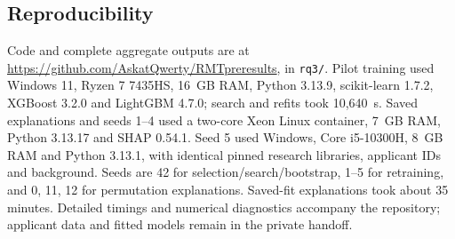 \subsection{Reproducibility}
Code and complete aggregate outputs are at \url{https://github.com/AskatQwerty/RMTpreresults}, in \texttt{rq3/}. Pilot training used Windows 11, Ryzen 7 7435HS, 16~GB RAM, Python 3.13.9, scikit-learn 1.7.2, XGBoost 3.2.0 and LightGBM 4.7.0; search and refits took 10,640~s. Saved explanations and seeds 1--4 used a two-core Xeon Linux container, 7~GB RAM, Python 3.13.17 and SHAP 0.54.1. Seed 5 used Windows, Core i5-10300H, 8~GB RAM and Python 3.13.1, with identical pinned research libraries, applicant IDs and background. Seeds are 42 for selection/search/bootstrap, 1--5 for retraining, and 0, 11, 12 for permutation explanations. Saved-fit explanations took about 35 minutes. Detailed timings and numerical diagnostics accompany the repository; applicant data and fitted models remain in the private handoff.
